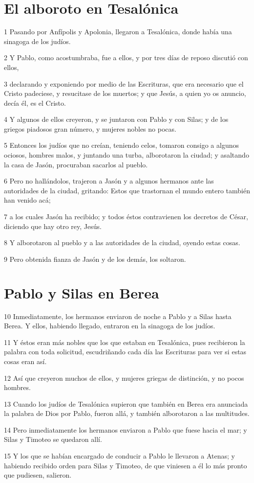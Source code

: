 \section*{El alboroto en Tesalónica}

\par 1 Pasando por Anfípolis y Apolonia, llegaron a Tesalónica, donde había una sinagoga de los judíos.
\par 2 Y Pablo, como acostumbraba, fue a ellos, y por tres días de reposo discutió con ellos,
\par 3 declarando y exponiendo por medio de las Escrituras, que era necesario que el Cristo padeciese, y resucitase de los muertos; y que Jesús, a quien yo os anuncio, decía él, es el Cristo.
\par 4 Y algunos de ellos creyeron, y se juntaron con Pablo y con Silas; y de los griegos piadosos gran número, y mujeres nobles no pocas.
\par 5 Entonces los judíos que no creían, teniendo celos, tomaron consigo a algunos ociosos, hombres malos, y juntando una turba, alborotaron la ciudad; y asaltando la casa de Jasón, procuraban sacarlos al pueblo.
\par 6 Pero no hallándolos, trajeron a Jasón y a algunos hermanos ante las autoridades de la ciudad, gritando: Estos que trastornan el mundo entero también han venido acá;
\par 7 a los cuales Jasón ha recibido; y todos éstos contravienen los decretos de César, diciendo que hay otro rey, Jesús.
\par 8 Y alborotaron al pueblo y a las autoridades de la ciudad, oyendo estas cosas.
\par 9 Pero obtenida fianza de Jasón y de los demás, los soltaron.

\section*{Pablo y Silas en Berea}

\par 10 Inmediatamente, los hermanos enviaron de noche a Pablo y a Silas hasta Berea. Y ellos, habiendo llegado, entraron en la sinagoga de los judíos.
\par 11 Y éstos eran más nobles que los que estaban en Tesalónica, pues recibieron la palabra con toda solicitud, escudriñando cada día las Escrituras para ver si estas cosas eran así.
\par 12 Así que creyeron muchos de ellos, y mujeres griegas de distinción, y no pocos hombres.
\par 13 Cuando los judíos de Tesalónica supieron que también en Berea era anunciada la palabra de Dios por Pablo, fueron allá, y también alborotaron a las multitudes.
\par 14 Pero inmediatamente los hermanos enviaron a Pablo que fuese hacia el mar; y Silas y Timoteo se quedaron allí.
\par 15 Y los que se habían encargado de conducir a Pablo le llevaron a Atenas; y habiendo recibido orden para Silas y Timoteo, de que viniesen a él lo más pronto que pudiesen, salieron.

